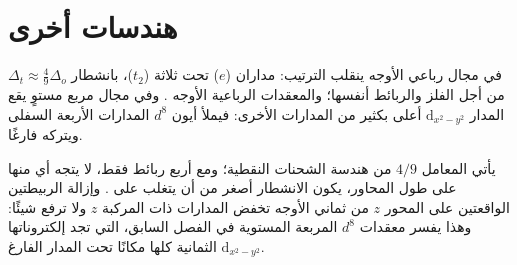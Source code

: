 \section{هندسات أخرى}

\begin{proposition}\label{prop:b2:ligand-field:tetrahedral}
في مجال رباعي الأوجه ينقلب الترتيب: مداران ($e$) تحت ثلاثة ($t_2$)،
بانشطار $\Delta_t \approx \frac49\Delta_o$ من أجل الفلز والربائط أنفسها؛ والمعقدات الرباعية الأوجه
. وفي مجال مربع مستوٍ يقع المدار $\mathrm d_{x^2-y^2}$ أعلى بكثير
من المدارات الأخرى: فيملأ أيون $d^8$ المدارات الأربعة السفلى ويتركه فارغًا.
\end{proposition}

\admitted

يأتي المعامل $4/9$ من هندسة الشحنات النقطية؛ ومع أربع ربائط فقط،
لا يتجه أي منها على طول المحاور، يكون الانشطار أصغر من أن يتغلب على . وإزالة الربيطتين الواقعتين على المحور $z$ من ثماني الأوجه تخفض المدارات ذات
المركبة $z$ ولا ترفع شيئًا: وهذا يفسر معقدات $d^8$ المربعة المستوية في
الفصل السابق، التي تجد إلكتروناتها الثمانية كلها مكانًا تحت المدار الفارغ
$\mathrm d_{x^2-y^2}$.

